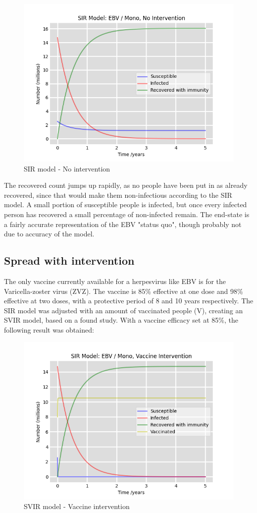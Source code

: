 \documentclass[12pt]{article}
\begin{document}
\begin{figure}[!htbp]
	\centering
	\includegraphics[width=0.5\linewidth]{no_intervention.png}
	\caption{SIR model - No intervention}\label{no_intervention}
\end{figure}

The recovered count jumps up rapidly, as no people have been put in as already recovered, since that
would make them non-infectious according to the SIR model. A small portion of susceptible people
is infected, but once every infected person has recovered a small percentage of non-infected remain. The end-state
is a fairly accurate representation of the EBV "status quo", though probably not due to accuracy of the model.

\subsection{Spread with intervention}

The only vaccine currently available for a herpesvirus like EBV is for the Varicella-zoster virus (ZVZ). The vaccine is 85\% effective at one dose and 98\% effective at two doses,
with a protective period of 8 and 10 years respectively.\cite{ZVZ} The SIR model was adjusted with an amount of vaccinated people (V), creating an SVIR model, based on a found study. \cite{model}
With a vaccine efficacy set at 85\%, the following result was obtained:

\begin{figure}[!htbp]
	\centering
	\includegraphics[width=0.5\linewidth]{vaccine_intervention.png}
	\caption{SVIR model - Vaccine intervention}\label{vaccine_intervention}
\end{figure}
\end{document}
